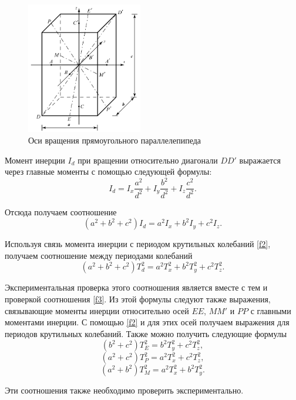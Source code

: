 \begin{figure}[h]
    \centering
    \includegraphics[width=0.45\textwidth]{pictures/ris2.png}
    \caption{Оси вращения прямоугольного параллелепипеда}\label{ris2}
\end{figure} 

Момент инерции $I_d$ при вращении относительно диагонали $DD'$ выражается через главные моменты с помощью следующей формулы:
\begin{equation}\label{f3}
		I_d = I_x \frac{a^2}{d^2} + I_y \frac{b^2}{d^2} + I_z \frac{c^2}{d^2}.
	\end{equation}
 
Отсюда получаем соотношение 
\begin{equation}\label{f4}
		(a^2 + b^2 + c^2)I_d = a^2 I_x  + b^2 I_y + c^2 I_z.
	\end{equation}
 
Используя связь момента инерции с периодом крутильных колебаний \ref{f2}, получаем соотношение между периодами колебаний
\begin{equation}\label{f4}
		(a^2 + b^2 + c^2)T_d^2 = a^2 T_x^2  + b^2 T_y^2 + c^2 T_z^2.
	\end{equation}
 
Экспериментальная проверка этого соотношения является вместе с тем и проверкой соотношения \ref{f3}. Из этой формулы следуют также выражения, связывающие моменты инерции относительно осей $EE$, $MM'$ и $PP$ с главными моментами инерции. С помощью \ref{f2} и для этих осей получаем выражения для периодов крутильных колебаний. Также можно получить следующие формулы
\begin{equation}\label{f4}
		(b^2 + c^2)T_E^2 = b^2 T_y^2 + c^2 T_z^2,
	\end{equation}
 \begin{equation}\label{f4}
		(a^2 + c^2)T_P^2 = a^2 T_x^2 + c^2 T_z^2,
	\end{equation}
 \begin{equation}\label{f4}
		(a^2 + b^2)T_M^2 = a^2 T_x^2  + b^2 T_y^2.
	\end{equation}
 
 Эти соотношения также необходимо проверить экспериментально.

 

 

\newpage